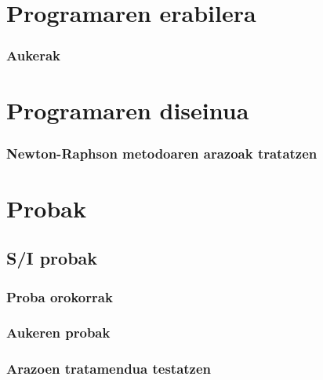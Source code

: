 \documentclass[10pt,a4paper,basque]{article}
\begin{document}
\section{Programaren erabilera}

\subsubsection{Aukerak}

\section{Programaren diseinua}

\subsubsection{Newton-Raphson metodoaren arazoak tratatzen}

\section{Probak}

\subsection{S/I probak}

\subsubsection{Proba orokorrak}

\subsubsection{Aukeren probak}

\subsubsection{Arazoen tratamendua testatzen}
\end{document}
